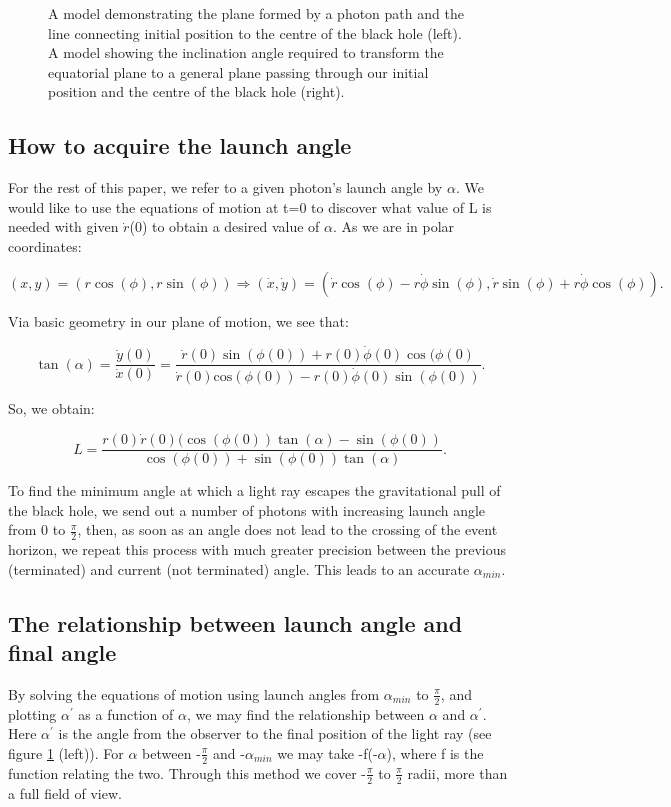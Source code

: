 \documentclass[oneside,openright,frontopenright, singlespacing]{dmathesis}
\begin{document}
\begin{figure}[!ht]
\begin{minipage}{0.5\textwidth}
	\end{minipage}
	\caption{A model demonstrating the plane formed by a photon path and the line connecting initial position to the centre of the black hole (left). A model showing the inclination angle required to transform the equatorial plane to a general plane passing through our initial position and the centre of the black hole (right).}
	\label{fig:Figure3.2}
\end{figure}

\subsection{How to acquire the launch angle}\label{subsec:Subsection3.5.2}

	For the rest of this paper, we refer to a given photon's launch angle by $\alpha$. We would like to use the equations of motion at t=0 to discover what value of L is needed with given $\dot{r}$(0) to obtain a desired value of $\alpha$. As we are in polar coordinates:

	\[(x, y) = (r\cos(\phi), r\sin(\phi)) \Rightarrow (\dot{x}, \dot{y}) = (\dot{r}\cos(\phi) - r\dot{\phi}\sin(\phi), \dot{r}\sin(\phi) + r\dot{\phi}\cos(\phi)).\]
	
	Via basic geometry in our plane of motion, we see that:
			
	\[\tan(\alpha) = \frac{\dot{y}(0)}{\dot{x}(0)} = \frac{\dot{r}(0)\sin(\phi(0)) + r(0)\dot{\phi}(0)\cos(\phi(0)}{\dot{r}(0)\mbox{cos}(\phi(0)) - r(0)\dot{\phi}(0)\sin(\phi(0))}.\]

	So, we obtain:

	\[ L = \frac{r(0)\dot{r}(0)(\cos(\phi(0))\tan(\alpha)-\sin(\phi(0))}{\cos(\phi(0))+\sin(\phi(0))\tan(\alpha)}.\]
	
	To find the minimum angle at which a light ray escapes the gravitational pull of the black hole, we send out a number of photons with increasing launch angle from 0 to $\frac{\pi}{2}$, then, as soon as an angle does not lead to the crossing of the event horizon, we repeat this process with much greater precision between the previous (terminated) and current (not terminated) angle. This leads to an accurate $\alpha_{min}$.

\subsection{The relationship between launch angle and final angle}\label{subsec:Subsection3.5.3}

	By solving the equations of motion using launch angles from $\alpha_{min}$ to $\frac{\pi}{2}$, and plotting $\alpha^{'}$ as a function of $\alpha$, we may find the relationship between $\alpha$ and $\alpha^{'}$. Here $\alpha^{'}$ is the angle from the observer to the final position of the light ray (see figure \ref{fig:Figure3.2} (left)). For $\alpha$ between -$\frac{\pi}{2}$ and -$\alpha_{min}$ we may take -f(-$\alpha$), where f is the function relating the two. Through this method we cover -$\frac{\pi}{2}$ to $\frac{\pi}{2}$ radii, more than a full field of view.
\end{document}
